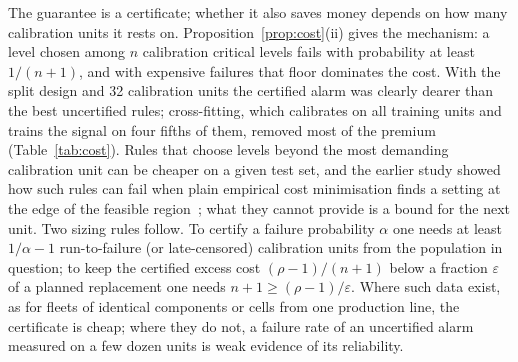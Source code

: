 The guarantee is a certificate; whether it also saves money depends on how many calibration units it rests on. Proposition~\ref{prop:cost}(ii) gives the mechanism: a level chosen among $n$ calibration critical levels fails with probability at least $1/(n+1)$, and with expensive failures that floor dominates the cost. With the split design and 32 calibration units the certified alarm was clearly dearer than the best uncertified rules; cross-fitting, which calibrates on all training units and trains the signal on four fifths of them, removed most of the premium (Table~\ref{tab:cost}).  Rules that choose levels beyond the most demanding calibration unit can be cheaper on a given test set, and the earlier study showed how such rules can fail when plain empirical cost minimisation finds a setting at the edge of the feasible region~\cite{prior}; what they cannot provide is a bound for the next unit. Two sizing rules follow. To certify a failure probability $\alpha$ one needs at least $1/\alpha-1$ run-to-failure (or late-censored) calibration units from the population in question; to keep the certified excess cost $(\rho-1)/(n+1)$ below a fraction $\varepsilon$ of a planned replacement one needs $n+1\ge(\rho-1)/\varepsilon$. Where such data exist, as for fleets of identical components or cells from one production line, the certificate is cheap; where they do not, a failure rate of an uncertified alarm measured on a few dozen units is weak evidence of its reliability.
